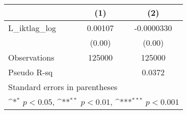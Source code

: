 {
\def\sym#1{\ifmmode^{#1}\else\(^{#1}\)\fi}
\begin{tabular}{l*{2}{c}}
\hline\hline
          &\multicolumn{1}{c}{(1)}         &\multicolumn{1}{c}{(2)}         \\
\hline
L\_iktlag\_log&  0.00107         &-0.0000330         \\
          &   (0.00)         &   (0.00)         \\
\hline
Observations&   125000         &   125000         \\
Pseudo R-sq&                  &   0.0372         \\
\hline\hline
\multicolumn{3}{l}{\footnotesize Standard errors in parentheses}\\
\multicolumn{3}{l}{\footnotesize \sym{*} \(p<0.05\), \sym{**} \(p<0.01\), \sym{***} \(p<0.001\)}\\
\end{tabular}
}
